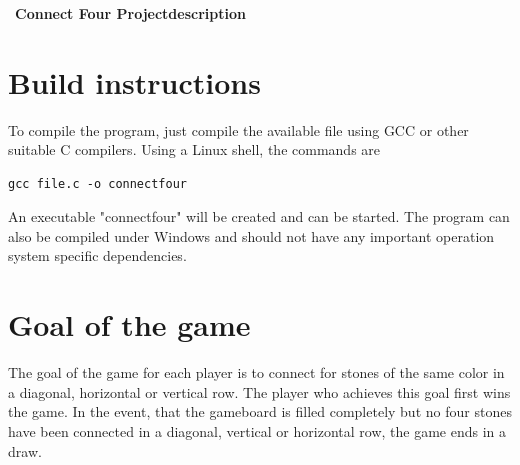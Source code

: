 \documentclass[10pt,a4paper,titlepage]{article}
\begin{document}
\tableofcontents
\ \\\\\\\
\textbf{\large Connect Four Projectdescription}\\
\section{Build instructions}
To compile the program, just compile the available file using GCC or other suitable C compilers. Using a Linux shell, the commands are \begin{lstlisting}
gcc file.c -o connectfour
\end{lstlisting}
An executable "connectfour" will be created and can be started. The program can also be compiled under Windows and should not have any important operation system specific dependencies.
\section{Goal of the game}
The goal of the game for each player is to connect for stones of the same color in a diagonal, horizontal or vertical row. The player who achieves this goal first wins the game. In the event, that the gameboard is filled completely but no four stones have been connected in a diagonal, vertical or horizontal row, the game ends in a draw.
\end{document}
